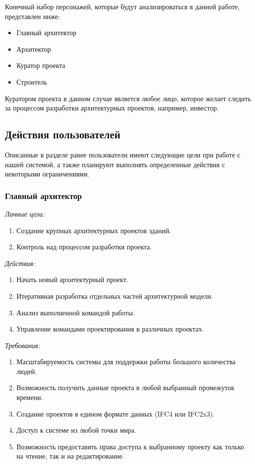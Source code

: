 \documentclass[a4paper,14pt]{extreport} %
\begin{document}
Конечный набор персонажей, которые будут анализироваться в данной работе, представлен ниже:
\begin{itemize}
\item Главный архитектор
\item Архитектор
\item Куратор проекта
\item Строитель
\end{itemize}

Куратором проекта в данном случае является любое лицо, которое желает следить за процессом разработки архитектурных проектов, например, инвестор.

\newpage
\subsection{Действия пользователей}

Описанные в разделе ранее пользователи имеют следующие цели при работе с нашей системой, а также планируют выполнять определенные действия с некоторыми ограничениями.

\subsubsection{Главный архитектор}

\textit{Личные цели:}
\begin{enumerate}
\item Создание крупных архитектурных проектов зданий.
\item Контроль над процессом разработки проекта.
\end{enumerate}
\textit{Действия:}
\begin{enumerate}
\item Начать новый архитектурный проект.
\item Итеративная разработка отдельных частей архитектурной модели.
\item Анализ выполненной командой работы.
\item Управление командами проектирования в различных проектах.
\end{enumerate}
\textit{Требования:}
\begin{enumerate}
\item Масштабируемость системы для поддержки работы большого количества людей.
\item Возможность получить данные проекта в любой выбранный промежуток времени.
\item Создание проектов в едином формате данных (IFC4 или IFC2x3).
\item Доступ к системе из любой точки мира.
\item Возможность предоставить права доступа к выбранному проекту как только на чтение, так и на редактирование.
\end{enumerate}
\end{document}
